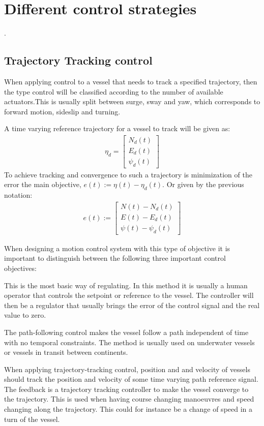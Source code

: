 \chapter{Different control strategies}

.

\section{Trajectory Tracking control}
When applying control to a vessel that needs to track a specified trajectory, then the type control will be classified according to the number of available actuators.This is usually split between surge, sway and yaw, which corresponds to forward motion, sideslip and turning.

A time varying reference trajectory for a vessel to track will be given as:
\begin{align}
\eta_d=
\begin{bmatrix}
N_d(t)\\
E_d(t)\\
\psi_d(t)
\end{bmatrix}
\end{align}
To achieve tracking and convergence to such a trajectory is minimization of the error the main objective, $e(t):=\eta(t)-\eta_d(t)$. Or given by the previous notation:
\begin{align}
e(t):=
\begin{bmatrix}
N(t)-N_d(t)\\
E(t)-E_d(t)\\
\psi(t)-\psi_d(t)
\end{bmatrix}
\end{align}

When designing a motion control system with this type of objective it is important to distinguish between the following three important control objectives:
\begin{description}[style=nextline]
	\item [Setpoint regulation]
	This is the most basic way of regulating. In this method it is usually a human operator that controls the setpoint or reference to the vessel. The controller will then be a regulator that usually brings the error of the control signal and the real value to zero.
	\item [Path-following control]
	The path-following control makes the vessel follow a path independent of time with no temporal constraints. The method is usually used on underwater vessels or vessels in transit between continents.
	\item [Trajectory-tracking control]
	When applying trajectory-tracking control, position and and velocity of vessels should track the position and velocity of some time varying path reference signal. The feedback is a trajectory tracking controller to make the vessel converge to the trajectory. This is used when having course changing manoeuvres and speed changing along the trajectory. This could for instance be a change of speed in a turn of the vessel.
\end{description}

